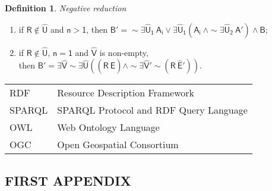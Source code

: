 \documentclass[inscr,ack,preface]{dithesis}
\theoremstyle{definition}
\newtheorem{definition}{Definition}[]
\newcommand{\msf}[1]{$\mathsf{#1}$}
\begin{document}
\begin{definition}{\emph{Negative reduction}}
\begin{enumerate}
\begin{enumerate}
          \item if \msf{R \not\in \widehat{U}} and \msf{n > 1},
                then \msf{B' = \sim \exists \widehat{U}_1 ~ A_i \lor \exists \widehat{U}_1 \left( A_i ~ \land \sim \exists \widehat{U}_2 ~ A' \right) \land B};
          \item if \msf{R \not\in \widehat{U}}, \msf{n = 1} and \msf{\widehat{V}} is non-empty, \\
                then \msf{B' = \exists \widehat{V} \sim \exists \widehat{U} \left( \left( R ~ \widehat{E} \right) \land \sim \exists \widehat{V}' \sim \left( R ~ \widehat{E}' \right) \right)}.
        \end{enumerate}
\end{enumerate}

\end{definition}

\backmatter

\abbreviations
\begin{center}
	\renewcommand{\arraystretch}{1.5}
	\begin{longtable}{ l @{\qquad} l }
	\toprule
	RDF    & Resource Description Framework \\
	SPARQL & SPARQL Protocol and RDF Query Language \\
	OWL    & Web Ontology Language \\
	OGC    & Open Geospatial Consortium \\
	\bottomrule
	\end{longtable}
\end{center}

\begin{appendix}
\appendixstartedtrue

{}

\chapter{FIRST APPENDIX}

\end{appendix}



\end{document}
